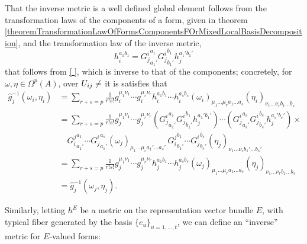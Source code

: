 That the inverse metric is a well defined global element follows from the transformation laws of the components of a form, given in theorem \ref{theoremTransformationLawOfFormsComponentsFOrMixedLocalBasisDecomposition}, and the transformation law of the inverse metric,
\begin{equation}
    h_i^{a_1 b_1} = {G^i_j}^{a_1}_{a_1'} {G^i_j}^{b_1}_{b_1'} h_j^{a_1' b_1'}
\end{equation}
that follows from \ref{              }, which is inverse to that of the components; concretely, for $\omega, \eta \in \Omega^p(A)$, over $U_{ij} \neq \empty$ it is satisfies that
\begin{align*}
    \hat g_j^{-1}(\omega_i, \eta_i) 
        &= \sum_{r+s = p} \frac{1}{r!s!} g_i^{\mu_1 \nu_1} \cdots g_i^{\mu_r \nu_r} h_i^{a_1 b_1} \cdots h_i^{a_s b_s} (\omega_i)_{\mu_1 \dots \mu_r a_1 \dots a_s} (\eta_i)_{\nu_1 \dots \nu_r b_1 \dots  b_s}\\
        &= \sum_{r+s = p} \frac{1}{r!s!} g_j^{\mu_1 \nu_1} \cdots g_j^{\mu_r \nu_r} 
        ({G^i_j}^{a_1}_{a_1'} {G^i_j}^{b_1}_{b_1'} h_j^{a_1' b_1'}) \cdots 
        ({G^i_j}^{a_s}_{a_s'} {G^i_j}^{b_s}_{b_s'} h_j^{a_s' b_s'}) \times \\
         &\quad  {G^j_i}^{a_1}_{a_1'}\cdots {G^i_j}^{a_s}_{a_s'} (\omega_j)_{\mu_1 \dots \mu_r a_1' \dots a_s'} \, {G^j_i}^{b_1}_{b_1'}\cdots {G^i_j}^{b_s}_{b_s'} (\eta_j)_{\nu_1 \dots \nu_r b_1' \dots  b_s'}\\
        &= \sum_{r+s = p} \frac{1}{r!s!} g_j^{\mu_1 \nu_1} \cdots g_j^{\mu_r \nu_r} h_j^{a_1 b_1} \cdots h_j^{a_s b_s} (\omega_j)_{\mu_1 \dots \mu_r a_1 \dots a_s} (\eta_j)_{\nu_1 \dots \nu_r b_1 \dots  b_s}\\
        &= \hat g_j^{-1}(\omega_j, \eta_j) .
\end{align*}

Similarly, letting $h^E$ be a metric on the representation vector bundle $E$, with typical fiber generated by the basis $\{e_u\}_{u = 1, \dots, t}$, we can define an ``inverse'' metric for $E$-valued forms:

